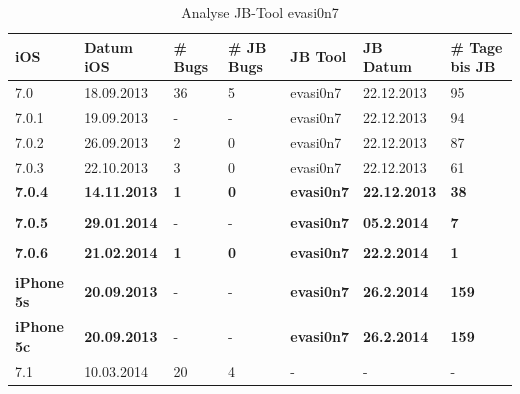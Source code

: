 \begin{table}[htp!]
    \begin{center}
        \begin{tabular}{| p{20mm} | p{22mm} | p{17mm} | p{25mm} | p{20mm} | p{22mm} | p{15mm} |} \hline
            \textbf{iOS} & \textbf{Datum iOS} & \textbf{\# Bugs} & \textbf{\# JB Bugs} & \textbf{JB Tool} & \textbf{JB Datum} & \textbf{\# Tage bis JB} \\ \hline 
7.0 & 18.09.2013 &	36 & 5 & evasi0n7 & 22.12.2013 & 95 \\ \hline
7.0.1 & 19.09.2013 & - & - & evasi0n7 & 22.12.2013 &  94 \\ \hline
7.0.2 & 26.09.2013 & 2 & 0 & evasi0n7 & 22.12.2013 & 87 \\ \hline
7.0.3 & 22.10.2013 & 3 & 0 & evasi0n7 & 22.12.2013 & 61\\ \hline
\textbf{7.0.4 }& \textbf{14.11.2013} & \textbf{1} & \textbf{0} & \textbf{evasi0n7 }& \textbf{22.12.2013} & \textbf{38} \\ \hline
 & & & & & & \\ \hline
\textbf{7.0.5} & \textbf{29.01.2014} & - & - & \textbf{evasi0n7} & \textbf{05.2.2014} & \textbf{7} \\ \hline
& & & & & & \\ \hline
\textbf{7.0.6} & \textbf{21.02.2014} & \textbf{1} & \textbf{0} & \textbf{evasi0n7} & \textbf{22.2.2014} & \textbf{1} \\ \hline
& & & & & & \\ \hline
\textbf{iPhone 5s} & \textbf{20.09.2013} & - & - & \textbf{evasi0n7 }& \textbf{26.2.2014} & \textbf{159} \\ \hline
\textbf{iPhone 5c} & \textbf{20.09.2013} & - & - & \textbf{evasi0n7 }& \textbf{26.2.2014} & \textbf{159} \\ \hline
7.1 & 10.03.2014 & 20 & 4 & - & - & - \\ \hline
        \end{tabular} 
        \caption{Analyse JB-Tool evasi0n7 \protect\footnotemark\protect\footnotemark}
        \label{tab:Analyseevasi0n7}
    \end{center}
\end{table}

